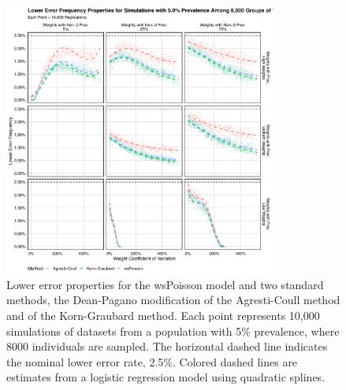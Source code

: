 \begin{figure}
\centering
\includegraphics[width=0.8\textwidth]{perfect_lower_error_frequency_8000_groups_0_05_prev}
\caption{Lower error properties for the wsPoisson model and two standard methods, the Dean-Pagano modification of the Agresti-Coull method and of the Korn-Graubard method.
Each point represents 10,000 simulations of datasets from a population with 5\% prevalence, where 8000 individuals are sampled.
The horizontal dashed line indicates the nominal lower error rate, 2.5\%.
Colored dashed lines are estimates from a logistic regression model using quadratic splines.}
\label{ch_3:fig:perfect_lower_error_frequency_8000_groups_0_05_prev}
\end{figure}

